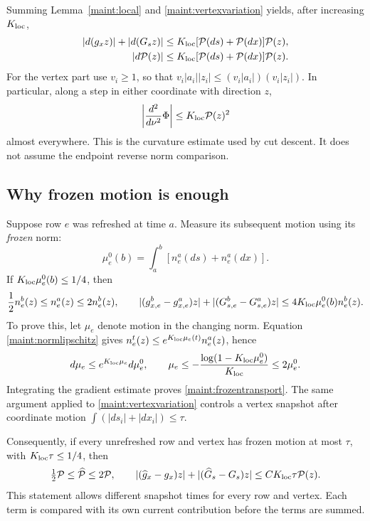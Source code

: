 \documentclass[11pt]{article}
\theoremstyle{definition}\newtheorem{definition}[theorem]{Definition}
\theoremstyle{remark}\newtheorem{remark}[theorem]{Remark}
\begin{document}
Summing Lemma~\ref{maint:local} and
\eqref{maint:vertexvariation} yields, after increasing $K_{\rm loc}$,
\begin{align}
 |d(g_xz)|+|d(G_sz)|
   &\leq K_{\rm loc}
      [\mathcal P(ds)+\mathcal P(dx)]\mathcal P(z),
                  \label{maint:globalvariation}\\
 |d\mathcal P(z)|
   &\leq K_{\rm loc}
      [\mathcal P(ds)+\mathcal P(dx)]\mathcal P(z).
                  \label{maint:globalnormvariation}
\end{align}
For the vertex part use $v_i\geq1$, so that
$v_i|a_i||z_i|\leq(v_i|a_i|)(v_i|z_i|)$.
In particular, along a step in either coordinate with direction $z$,
\begin{equation}
 \left|\frac{d^2}{d\nu^2}\Phi\right|
       \leq K_{\rm loc}\mathcal P(z)^2
 \label{maint:curvature}
\end{equation}
almost everywhere. This is the curvature estimate used by cut descent.
It does not assume the endpoint reverse norm comparison.

\subsection{Why frozen motion is enough}

Suppose row $e$ was refreshed at time $a$. Measure its subsequent motion
using its \emph{frozen} norm:
\[
 \mu_e^0(b)=\int_a^b[n_e^a(ds)+n_e^a(dx)].
\]
If $K_{\rm loc}\mu_e^0(b)\leq1/4$, then
\begin{equation}
 \frac12 n_e^b(z)\leq n_e^a(z)\leq2n_e^b(z),\qquad
 |(g_{x,e}^b-g_{x,e}^a)z|
 +|(G_{s,e}^b-G_{s,e}^a)z|
 \leq4K_{\rm loc}\mu_e^0(b)n_e^b(z).
 \label{maint:frozentransport}
\end{equation}
To prove this, let $\mu_e$ denote motion in the changing norm. Equation
\eqref{maint:normlipschitz} gives
$n_e^t(z)\leq e^{K_{\rm loc}\mu_e(t)}n_e^a(z)$, hence
\[
 d\mu_e\leq e^{K_{\rm loc}\mu_e}d\mu_e^0,
 \qquad
 \mu_e\leq-\frac{\log(1-K_{\rm loc}\mu_e^0)}{K_{\rm loc}}
       \leq2\mu_e^0.
\]
Integrating the gradient estimate proves
\eqref{maint:frozentransport}. The same argument applied to
\eqref{maint:vertexvariation} controls a vertex snapshot after
coordinate motion $\int(|ds_i|+|dx_i|)\leq\tau$.

Consequently, if every unrefreshed row and vertex has frozen motion at
most $\tau$, with $K_{\rm loc}\tau\leq1/4$, then
\begin{equation}
 \tfrac12\mathcal P\leq\widehat{\mathcal P}\leq2\mathcal P,
 \qquad
 |(\widehat g_x-g_x)z|+|(\widehat G_s-G_s)z|
       \leq C K_{\rm loc}\tau\mathcal P(z).
 \label{maint:cachecertificate}
\end{equation}
This statement allows different snapshot times for every row and
vertex. Each term is compared with its own current contribution before
the terms are summed.
\end{document}

